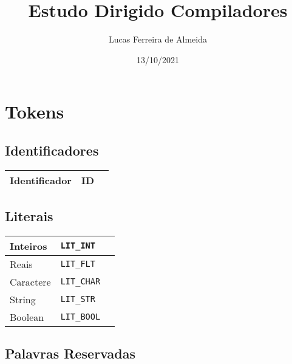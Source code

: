 \documentclass{article}
\title{Estudo Dirigido Compiladores}
\author{Lucas Ferreira de Almeida}
\date{13/10/2021}
\begin{document}
	
	\maketitle
	
	\tableofcontents
	
	\pagebreak
	
	\section{Tokens}
	
	\subsection{Identificadores}
	
	\begin{tabularx}{0.8\textwidth} { 
			| >{\raggedright\arraybackslash}X 
			| >{\centering\arraybackslash}X 
			| >{\raggedleft\arraybackslash}X | }
		\hline
		Identificador & ID  \\
		\hline
	\end{tabularx}
	
	\subsection{Literais}
	
	\begin{tabularx}{0.8\textwidth} { 
			| >{\raggedright\arraybackslash}X 
			| >{\centering\arraybackslash}X 
			| >{\raggedleft\arraybackslash}X | }
		\hline
		Inteiros & \texttt{LIT\_INT}  \\
		\hline
		Reais & \texttt{LIT\_FLT}   \\
		\hline
		Caractere & \texttt{LIT\_CHAR}  \\
		\hline
		String & \texttt{LIT\_STR}   \\
		\hline
		Boolean & \texttt{LIT\_BOOL}  \\
		\hline
	\end{tabularx}
	
	\subsection{Palavras Reservadas}
	
\end{document}
